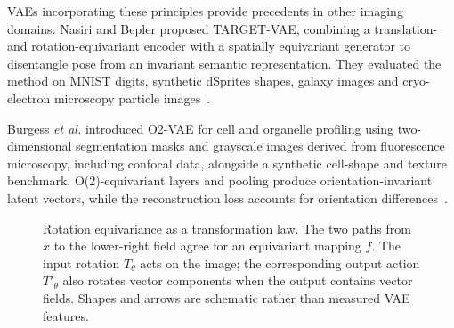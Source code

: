 \documentclass{midl}
\begin{document}
VAEs incorporating these principles provide precedents in other imaging domains. Nasiri and Bepler proposed TARGET-VAE, combining a translation- and rotation-equivariant encoder with a spatially equivariant generator to disentangle pose from an invariant semantic representation. They evaluated the method on MNIST digits, synthetic dSprites shapes, galaxy images and cryo-electron microscopy particle images~\cite{nasiri_target_2022}.

Burgess \emph{et al.} introduced O2-VAE for cell and organelle profiling using two-dimensional segmentation masks and grayscale images derived from fluorescence microscopy, including confocal data, alongside a synthetic cell-shape and texture benchmark. O(2)-equivariant layers and pooling produce orientation-invariant latent vectors, while the reconstruction loss accounts for orientation differences~\cite{burgess_orientation_2024}.

\begin{figure}[t]
\centering
{}
\caption{Rotation equivariance as a transformation law. The two paths from $x$ to the lower-right field agree for an equivariant mapping $f$. The input rotation $T_\theta$ acts on the image; the corresponding output action $T'_\theta$ also rotates vector components when the output contains vector fields. Shapes and arrows are schematic rather than measured VAE features.}
\label{fig:rotation-equivariance}
\end{figure}
\end{document}
